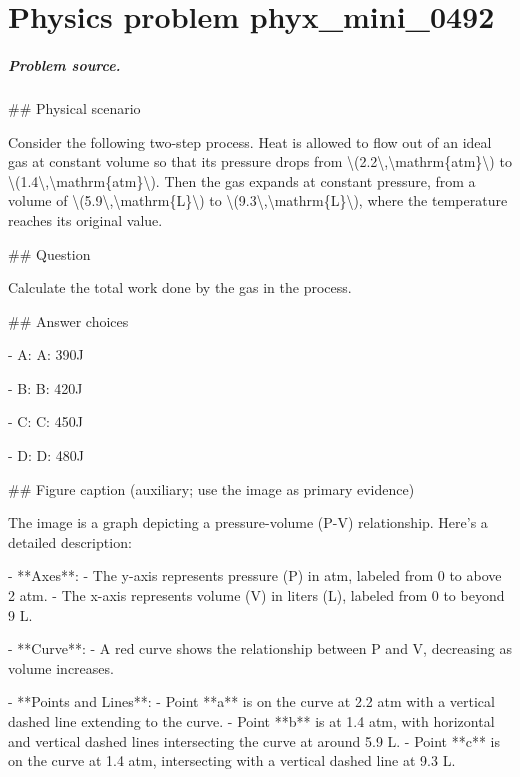 
\chapter{Physics problem phyx\_mini\_0492}
\label{ch:PhyXMiniProblems_problem_phyx_mini_0492}

\paragraph{Problem source.}
\#\# Physical scenario

Consider the following two-step process. Heat is allowed to flow out of an ideal gas at constant volume so that its pressure drops from \textbackslash{}(2.2\textbackslash{},\textbackslash{}mathrm\{atm\}\textbackslash{}) to \textbackslash{}(1.4\textbackslash{},\textbackslash{}mathrm\{atm\}\textbackslash{}). Then the gas expands at constant pressure, from a volume of \textbackslash{}(5.9\textbackslash{},\textbackslash{}mathrm\{L\}\textbackslash{}) to \textbackslash{}(9.3\textbackslash{},\textbackslash{}mathrm\{L\}\textbackslash{}), where the temperature reaches its original value.

\#\# Question

Calculate the total work done by the gas in the process.

\#\# Answer choices

- A: A: 390J

- B: B: 420J

- C: C: 450J

- D: D: 480J

\#\# Figure caption (auxiliary; use the image as primary evidence)

The image is a graph depicting a pressure-volume (P-V) relationship. Here's a detailed description:

- **Axes**: 
  - The y-axis represents pressure (P) in atm, labeled from 0 to above 2 atm.
  - The x-axis represents volume (V) in liters (L), labeled from 0 to beyond 9 L.

- **Curve**: 
  - A red curve shows the relationship between P and V, decreasing as volume increases.

- **Points and Lines**:
  - Point **a** is on the curve at 2.2 atm with a vertical dashed line extending to the curve.
  - Point **b** is at 1.4 atm, with horizontal and vertical dashed lines intersecting the curve at around 5.9 L.
  - Point **c** is on the curve at 1.4 atm, intersecting with a vertical dashed line at 9.3 L.

